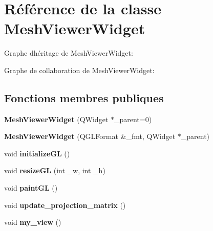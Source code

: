 \hypertarget{classMeshViewerWidget}{}\section{Référence de la classe Mesh\+Viewer\+Widget}
\label{classMeshViewerWidget}


Graphe d\textquotesingle{}héritage de Mesh\+Viewer\+Widget\+:


Graphe de collaboration de Mesh\+Viewer\+Widget\+:
\subsection*{Fonctions membres publiques}
\begin{DoxyCompactItemize}
\item 
\mbox{\label{classMeshViewerWidget_abb3882da8de0f1d08d652a14313e9515}} 
{\bfseries Mesh\+Viewer\+Widget} (Q\+Widget $\ast$\+\_\+parent=0)
\item 
\mbox{\label{classMeshViewerWidget_a7cf3528018adb2334ba5d983eb150448}} 
{\bfseries Mesh\+Viewer\+Widget} (Q\+G\+L\+Format \&\+\_\+fmt, Q\+Widget $\ast$\+\_\+parent)
\item 
\mbox{\label{classMeshViewerWidget_a8b2d34a70c5b981579c408523d19ca77}} 
void {\bfseries initialize\+GL} ()
\item 
\mbox{\label{classMeshViewerWidget_ae97219a7de61d27ecc5b8cd72aa05930}} 
void {\bfseries resize\+GL} (int \+\_\+w, int \+\_\+h)
\item 
\mbox{\label{classMeshViewerWidget_a7914bf37120b84e5da9a4281d7b7de39}} 
void {\bfseries paint\+GL} ()
\item 
\mbox{\label{classMeshViewerWidget_a35f545aa53a3302470c23aaa3a4bf08d}} 
void {\bfseries update\+\_\+projection\+\_\+matrix} ()
\item 
\mbox{\label{classMeshViewerWidget_a5e7e836e06a5eec60e1c8f75f0baea6a}} 
void {\bfseries my\+\_\+view} ()
\item 
\mbox{\label{classMeshViewerWidget_a59599338a500cc33519bb766a9a2cb34}} 

\end{DoxyCompactItemize}
